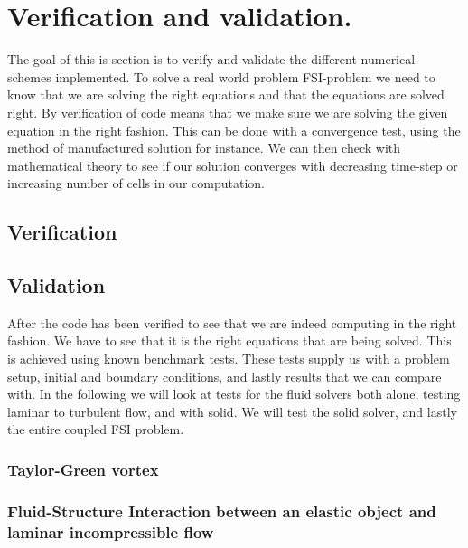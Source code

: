 \chapter{Verification and validation. }
The goal of this is section is to verify and validate the different numerical schemes implemented. To solve a real world problem FSI-problem we need to know that we are solving the right equations and that the equations are solved right. By verification of code means that we make sure we are solving the given equation in the right fashion. This can be done with a convergence test, using the method of manufactured solution for instance. We can then check with mathematical theory to see if our solution converges with decreasing time-step or increasing number of cells in our computation.
\section{Verification}
\section{Validation}
After the code has been verified to see that we are indeed computing in the right fashion. We have to see that it is the right equations that are being solved. This is achieved using known benchmark tests. These tests supply us with a problem setup, initial and boundary conditions, and lastly results that we can compare with. In the following we will look at tests for the fluid solvers both alone, testing laminar to turbulent flow, and with solid. We will test the solid solver, and lastly the entire coupled FSI problem.
\subsection{Taylor-Green vortex}

\subsection{Fluid-Structure Interaction between an elastic object and laminar incompressible flow}
